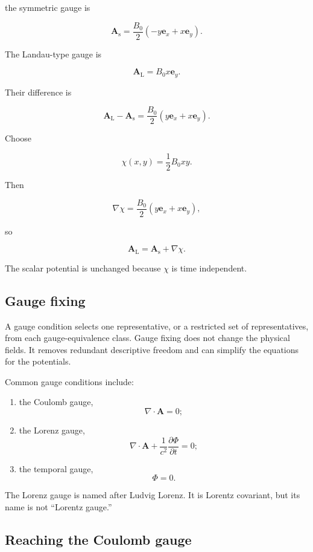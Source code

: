 the symmetric gauge is

\[
\mathbf{A}_{\mathrm{s}}
=
\frac{B_0}{2}
\left(
-y\mathbf{e}_x
+x\mathbf{e}_y
\right).
\]

The Landau-type gauge is

\[
\mathbf{A}_{\mathrm{L}}
=
B_0x\mathbf{e}_y.
\]

Their difference is

\[
\mathbf{A}_{\mathrm{L}}
-
\mathbf{A}_{\mathrm{s}}
=
\frac{B_0}{2}
\left(
y\mathbf{e}_x
+x\mathbf{e}_y
\right).
\]

Choose

\[
\chi(x,y)
=
\frac{1}{2}B_0xy.
\]

Then

\[
\nabla\chi
=
\frac{B_0}{2}
\left(
y\mathbf{e}_x
+x\mathbf{e}_y
\right),
\]

so

\[
\mathbf{A}_{\mathrm{L}}
=
\mathbf{A}_{\mathrm{s}}
+
\nabla\chi.
\]

The scalar potential is unchanged because \(\chi\) is time independent.

\subsection{Gauge fixing}

A gauge condition selects one representative, or a restricted set of representatives, from each gauge-equivalence class. Gauge fixing does not change the physical fields. It removes redundant descriptive freedom and can simplify the equations for the potentials.

Common gauge conditions include:

\begin{enumerate}
    \item the Coulomb gauge,
    \[
    \boxed{
    \nabla\cdot\mathbf{A}=0
    };
    \]

    \item the Lorenz gauge,
    \[
    \boxed{
    \nabla\cdot\mathbf{A}
    +
    \frac{1}{c^2}
    \frac{\partial\Phi}{\partial t}
    =0
    };
    \]

    \item the temporal gauge,
    \[
    \boxed{
    \Phi=0
    }.
    \]
\end{enumerate}

The Lorenz gauge is named after Ludvig Lorenz. It is Lorentz covariant, but its name is not ``Lorentz gauge.''

\subsection{Reaching the Coulomb gauge}

